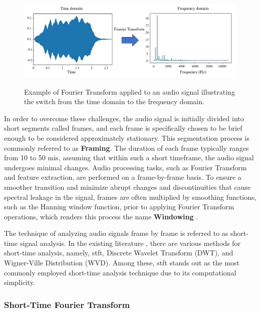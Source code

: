 \begin{figure}[htbp]
    \raggedright
        \caption{Example of Fourier Transform applied to an audio signal illustrating the switch from the time domain to the frequency domain.}
        \includegraphics[width=1.0\textwidth]{resources/images/030-theoretical_framework/Framework_digital_audio_fourier_transform.png}
        \label{fig:frmwk_digital_audio_fourier_transform}
\end{figure}

In order to overcome these challenges, the audio signal is initially divided into short segments called frames, and each frame is specifically chosen to be brief enough to be considered approximately stationary. This segmentation process is commonly referred to as \textbf{Framing}. The duration of each frame typically ranges from 10 to 50 \gls{mi}\gls{s}, assuming that within such a short timeframe, the audio signal undergoes minimal changes. Audio processing tasks, such as Fourier Transform and feature extraction, are performed on a frame-by-frame basis. To ensure a smoother transition and minimize abrupt changes and discontinuities that cause spectral leakage in the signal, frames are often multiplied by smoothing functions, such as the Hanning window function, prior to applying Fourier Transform operations, which renders this process the name \textbf{Windowing} \cite{Abreha2014}.

The technique of analyzing audio signals frame by frame is referred to as short-time signal analysis. In the existing literature \cite{Debnath2014}, there are various methods for short-time analysis, namely, \gls{stft}, Discrete Wavelet Transform (DWT), and Wigner-Ville Distribution (WVD). Among these, \gls{stft} stands out as the most commonly employed short-time analysis technique due to its computational simplicity.


\subsubsection{Short-Time Fourier Transform}
\label{subsubsec:audio_fundamentals_fourier_transform}

